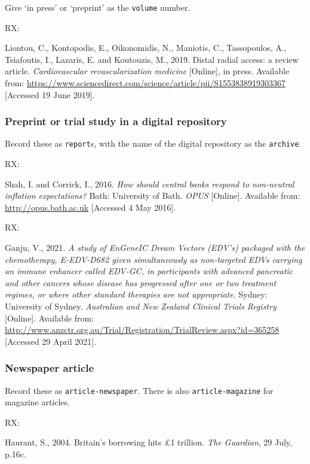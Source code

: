 Give `in press' or `preprint' as the \texttt{volume} number.

RX: \cite{liontou.etal2019dra}

Liontou, C., Kontopodis, E., Oikonomidis, N., Maniotis, C., Tassopoulos, A., Tsiafoutis, I., Lazaris, E. and Koutouzis, M., 2019. Distal radial access: a review article. \emph{Cardiovascular revascularization medicine} [Online], in press. Available from: \url{https://www.sciencedirect.com/science/article/pii/S1553838919303367} [Accessed 19 June 2019].



\subsubsection*{Preprint or trial study in a digital repository}

Record these as \texttt{report}s, with the name of the digital repository as the \texttt{archive}.

RX: \cite{shah.corrick2016hsc}

Shah, I. and Corrick, I., 2016. \emph{How should central banks respond to non-neutral inflation expectations?} Bath: University of Bath. \emph{OPUS} [Online]. Available from: \url{http://opus.bath.ac.uk} [Accessed 4 May 2016].


RX: \cite{ganju2021sed}

Ganju, V., 2021. \emph{A study of EnGeneIC Dream Vectors (EDV's) packaged with the chemotherapy, E-EDV-D682 given simultaneously as non-targeted EDVs carrying an immune enhancer called EDV-GC, in participants with advanced pancreatic and other cancers whose disease has progressed after one or two treatment regimes, or where other standard therapies are not appropriate}. Sydney: University of Sydney. \emph{Australian and New Zealand Clinical Trials Registry} [Online]. Available from: \url{http://www.anzctr.org.au/Trial/Registration/TrialReview.aspx?id=365258} [Accessed 29 April 2021].



\subsubsection*{Newspaper article}

Record these as \texttt{article-newspaper}. There is also \texttt{article-magazine} for magazine articles.

RX: \cite{haurant2004bbh}

Haurant, S., 2004. Britain's borrowing hits £1 trillion. \emph{The Guardian}, 29 July, p.16c.


